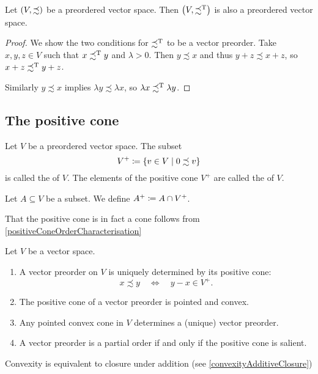 \begin{lemma} \label{vectorPreorderDual}
Let $\sSet{V,\precsim}$ be a preordered vector space. Then $\sSet{V,\precsim^\transp}$ is also a preordered vector space.
\end{lemma}
\begin{proof}
We show the two conditions for $\precsim^{\mathrm{T}}$ to be a vector preorder. Take $x,y,z\in V$ such that $x\precsim^{\mathrm{T}} y$ and $\lambda > 0$. Then $y \precsim x$ and thus $y + z \precsim x+z$, so $x+z \precsim^{\mathrm{T}} y+z$.

Similarly $y\precsim x$ implies $\lambda y \precsim \lambda x$, so $\lambda x \precsim^{\mathrm{T}} \lambda y$.
\end{proof}

\subsection{The positive cone}
\begin{definition}
Let $V$ be a preordered vector space. The subset
\[ V^+ \defeq \setbuilder{v\in V}{0 \precsim v} \]
is called the  of $V$. The elements of the positive cone $V^+$ are called the  of $V$.

Let $A\subseteq V$ be a subset. We define $A^+ \coloneqq A\cap V^+$.
\end{definition}
That the positive cone is in fact a cone follows from \ref{positiveConeOrderCharacterisation}
\begin{proposition} \label{positiveCone}
Let $V$ be a vector space.
\begin{enumerate}
\item A vector preorder on $V$ is uniquely determined by its positive cone:
\[ x \precsim y \quad\iff\quad y-x \in V^+. \]
\item The positive cone of a vector preorder is pointed and convex.
\item Any pointed convex cone in $V$ determines a (unique) vector preorder.
\item A vector preorder is a partial order \textup{if and only if} the positive cone is salient.
\end{enumerate}
\end{proposition}
Convexity is equivalent to closure under addition (see \ref{convexityAdditiveClosure})
